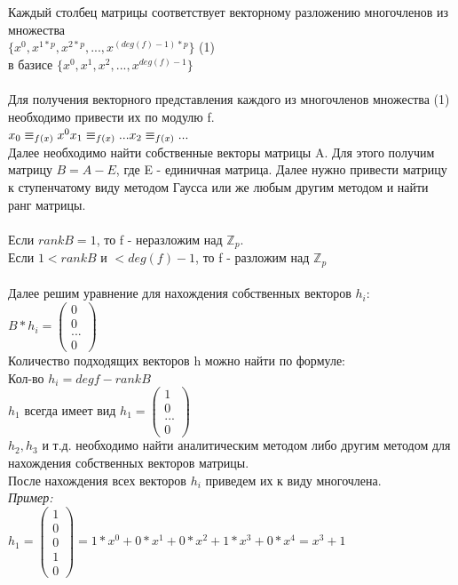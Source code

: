 \documentclass[12pt]{article}
\begin{document}
Каждый столбец матрицы соответствует векторному разложению многочленов из множества \\
$\{x^0, x^{1*p}, x^{2*p}, ..., x^{(deg(f)-1)*p}\}$ \hspace{0,5cm} (1)\\
в базисе $\{x^0, x^1, x^2, ..., x^{deg(f)-1}\}$\\\\
Для получения векторного представления каждого из многочленов множества (1) необходимо привести их по модулю f.\\
$x_0 \equiv_{f(x)} x^0\\
    x_1 \equiv_{f(x)}...\\
    x_2 \equiv_{f(x)}...$\\

Далее необходимо найти собственные векторы матрицы A. Для этого получим матрицу $B = A - E$, где E - единичная матрица. Далее нужно привести матрицу к ступенчатому виду методом Гаусса или же любым другим методом и найти ранг матрицы.\\\\
Если $rank B = 1$, то f - неразложим над $\mathbb{Z}_p$.\\
Если $1 < rank B$  и $ < deg(f)-1$, то f - разложим над $\mathbb{Z}_p$\\\\
Далее решим уравнение для нахождения собственных векторов $h_i$:\\
$B*h_i= \begin{pmatrix}
        0   \\
        0   \\
        ... \\
        0
    \end{pmatrix}$\\
Количество подходящих векторов h можно найти по формуле:\\
Кол-во $h_i = deg f - rank B$\\
$h_1$ всегда имеет вид $h_1= \begin{pmatrix}
        1   \\
        0   \\
        ... \\
        0
    \end{pmatrix}$\\
$h_2, h_3$ и т.д. необходимо найти аналитическим методом либо другим методом для нахождения собственных векторов матрицы.\\

После нахождения всех векторов $h_i$ приведем их к виду многочлена.\\
\textit{Пример:}\\
$h_1= \begin{pmatrix}
        1 \\
        0 \\
        0 \\
        1 \\
        0
    \end{pmatrix} = 1*x^0 + 0 * x^1 + 0 * x^2 + 1 * x^3 + 0 * x^4 = x^3 + 1$\\\\
\end{document}
